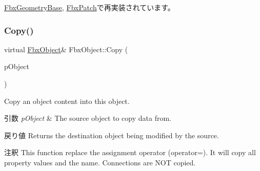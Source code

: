 \hyperlink{class_fbx_geometry_base_a7b80ccbcd2b15bbedbe7dd7e0739a3b3}{Fbx\+Geometry\+Base}, \hyperlink{class_fbx_patch_a2ecc16ad355ca521c921ec3731719585}{Fbx\+Patch}で再実装されています。

\mbox{\label{class_fbx_object_a0c0c5adb38284d14bb82c04d54504a3e}} 
\subsubsection{\texorpdfstring{Copy()}{Copy()}}
{\footnotesize\ttfamily virtual \hyperlink{class_fbx_object}{Fbx\+Object}\& Fbx\+Object\+::\+Copy (\begin{DoxyParamCaption}\item[{const \hyperlink{class_fbx_object}{Fbx\+Object} \&}]{p\+Object }\end{DoxyParamCaption})\hspace{0.3cm}{\ttfamily [virtual]}}

Copy an object content into this object. 
\begin{DoxyParams}{引数}
{\em p\+Object} & The source object to copy data from. \\
\hline
\end{DoxyParams}
\begin{DoxyReturn}{戻り値}
Returns the destination object being modified by the source. 
\end{DoxyReturn}
\begin{DoxyRemark}{注釈}
This function replace the assignment operator (operator=). It will copy all property values and the name. Connections are N\+OT copied. 
\end{DoxyRemark}


